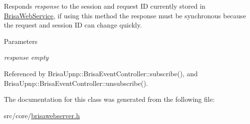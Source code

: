 Responds {\itshape response\/} to the session and request ID currently stored in \hyperlink{classBrisaCore_1_1BrisaWebService}{BrisaWebService}, if using this method the response must be synchronous because the request and session ID can change quickly. 
\begin{DoxyParams}{Parameters}
\item[{\em response}]{\itshape empty\/} \end{DoxyParams}


Referenced by BrisaUpnp::BrisaEventController::subscribe(), and BrisaUpnp::BrisaEventController::unsubscribe().

The documentation for this class was generated from the following file:\begin{DoxyCompactItemize}
\item 
src/core/\hyperlink{brisawebserver_8h}{brisawebserver.h}\end{DoxyCompactItemize}
